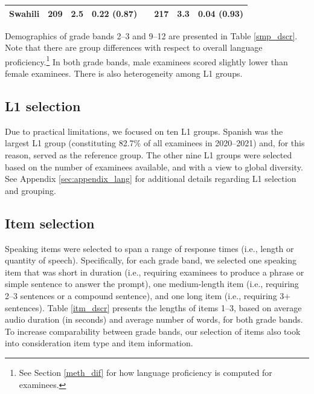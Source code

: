 \documentclass [PhD] {uclathes}
\begin{document}
\begin{table}[htbp]
\begin{tabular}{lccccccc}
    \hspace{3mm} Swahili & 209 & 2.5 & 0.22 (0.87) & & 217 & 3.3 & 0.04 (0.93) \\
    \bottomrule
    \end{tabular}
\end{table}

Demographics of grade bands 2–3 and 9–12 are presented in Table \ref{smp_dscr}. Note that there are group differences with respect to overall language proficiency.\footnote{See Section \ref{meth_dif} for how language proficiency is computed for examinees.} In both grade bands, male examinees scored slightly lower than female examinees. There is also heterogeneity among L1 groups.

\subsection{L1 selection}

Due to practical limitations, we focused on ten L1 groups. Spanish was the largest L1 group (constituting 82.7\% of all examinees in 2020–2021) and, for this reason, served as the reference group. The other nine L1 groups were selected based on the number of examinees available, and with a view to global diversity. See Appendix \ref{sec:appendix_lang} for additional details regarding L1 selection and grouping.

\subsection{Item selection}

Speaking items were selected to span a range of response times (i.e., length or quantity of speech). Specifically, for each grade band, we selected one speaking item that was short in duration (i.e., requiring examinees to produce a phrase or simple sentence to answer the prompt), one medium-length item (i.e., requiring 2–3 sentences or a compound sentence), and one long item (i.e., requiring 3+ sentences). Table \ref{itm_dscr} presents the lengths of items 1–3, based on average audio duration (in seconds) and average number of words, for both grade bands. To increase comparability between grade bands, our selection of items also took into consideration item type and item information.
\end{document}
